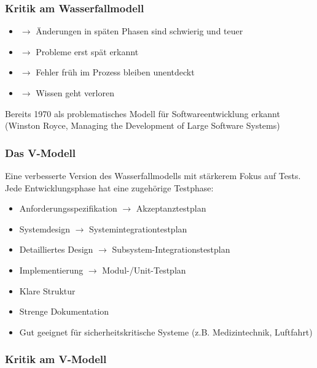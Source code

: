 \subsubsection*{Kritik am Wasserfallmodell}

    \begin{itemize}
        \item {} $\rightarrow$ Änderungen in späten Phasen sind schwierig und teuer
        \item {} $\rightarrow$ Probleme erst spät erkannt
        \item {} $\rightarrow$ Fehler früh im Prozess bleiben unentdeckt
        \item {} $\rightarrow$ Wissen geht verloren
    \end{itemize}
     Bereits 1970 als problematisches Modell für Softwareentwicklung erkannt (Winston Royce, Managing the Development of Large Software Systems)

\subsubsection*{Das V-Modell}

    Eine verbesserte Version des Wasserfallmodells mit stärkerem Fokus auf Tests.\\
    Jede Entwicklungsphase hat eine zugehörige Testphase:
    \begin{itemize}
        \item Anforderungsspezifikation $\rightarrow$ Akzeptanztestplan
        \item Systemdesign $\rightarrow$ Systemintegrationtestplan
        \item Detailliertes Design $\rightarrow$ Subsystem-Integrationstestplan
        \item Implementierung $\rightarrow$ Modul-/Unit-Testplan
    \end{itemize}
    \begin{itemize}
        \item Klare Struktur
        \item Strenge Dokumentation
        \item Gut geeignet für sicherheitskritische Systeme (z.B. Medizintechnik, Luftfahrt)
    \end{itemize}

\subsubsection*{Kritik am V-Modell}

